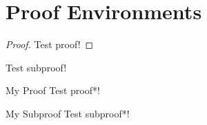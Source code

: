 \documentclass{scrartcl}
\begin{document}
\newpage

\section{Proof Environments}
\begin{proof}
    Test proof!
\end{proof}
\begin{subproof}
    Test subproof!
\end{subproof}
\begin{proof*}{My Proof}
    Test proof*!
\end{proof*}
\begin{subproof*}{My Subproof}
    Test subproof*!
\end{subproof*}
\end{document}
